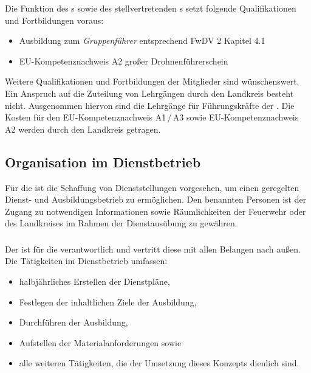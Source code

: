 \noindent Die Funktion des \gruppenfuehrer{}s sowie des stellvertretenden \gruppenfuehrer{}s setzt folgende Qualifikationen und Fortbildungen voraus:

\begin{itemize}
 \item Ausbildung zum \textit{Gruppenführer} entsprechend FwDV 2 Kapitel 4.1
 \item EU-Kompetenznachweis A2 \flq großer Drohnenführerschein\frq{}
\end{itemize}

\noindent Weitere Qualifikationen und Fortbildungen der Mitglieder sind wünschenswert. Ein Anspruch auf die Zuteilung von Lehrgängen durch den Landkreis besteht nicht. Ausgenommen hiervon sind die Lehrgänge für Führungskräfte der \callee{}. Die Kosten für den EU-Kompetenznachweis A1\,/\,A3 sowie EU-Kompetenznachweis A2 werden durch den Landkreis \district{} getragen.

\subsection{Organisation im Dienstbetrieb}

Für die \callee{} ist die Schaffung von Dienststellungen vorgesehen, um einen geregelten Dienst- und Ausbildungsbetrieb zu ermöglichen. Den benannten Personen ist der Zugang zu notwendigen Informationen sowie Räumlichkeiten der Feuerwehr oder des Landkreises im Rahmen der Dienstausübung zu gewähren.

\subsubsection{\gruppenfuehrer{}}

Der \gruppenfuehrer{} ist für die \callee{} verantwortlich und vertritt diese mit allen Belangen nach außen. Die Tätigkeiten im Dienstbetrieb umfassen:

\begin{itemize}
 \item halbjährliches Erstellen der Dienstpläne,
 \item Festlegen der inhaltlichen Ziele der Ausbildung,
 \item Durchführen der Ausbildung,
 \item Aufstellen der Materialanforderungen sowie
 \item alle weiteren Tätigkeiten, die der Umsetzung dieses Konzepts dienlich sind.
\end{itemize}

